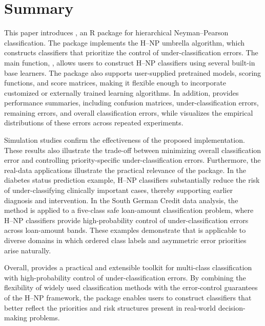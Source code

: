 \section{Summary}

This paper introduces \href{https://cran.r-project.org/web/packages/HNPclassifier/index.html}{}, an R package for hierarchical Neyman--Pearson classification. The package implements the H--NP umbrella algorithm, which constructs classifiers that prioritize the control of under-classification errors. The main function, , allows users to construct H--NP classifiers using several built-in base learners. The package also supports user-supplied pretrained models, scoring functions, and score matrices, making it flexible enough to incorporate customized or externally trained learning algorithms. In addition,  provides performance summaries, including confusion matrices, under-classification errors, remaining errors, and overall classification errors, while  visualizes the empirical distributions of these errors across repeated experiments.


Simulation studies confirm the effectiveness of the proposed implementation. These results also illustrate the trade-off between minimizing overall classification error and controlling priority-specific under-classification errors. Furthermore, the real-data applications illustrate the practical relevance of the package. In the diabetes status prediction example, H--NP classifiers substantially reduce the risk of under-classifying clinically important cases, thereby supporting earlier diagnosis and intervention. In the South German Credit data analysis, the method is applied to a five-class safe loan-amount classification problem, where H--NP classifiers provide high-probability control of under-classification errors across loan-amount bands. These examples demonstrate that \href{https://cran.r-project.org/web/packages/HNPclassifier/index.html}{} is applicable to diverse domains in which ordered class labels and asymmetric error priorities arise naturally.

Overall, \href{https://cran.r-project.org/web/packages/HNPclassifier/index.html}{} provides a practical and extensible toolkit for multi-class classification with high-probability control of under-classification errors. By combining the flexibility of widely used classification methods with the error-control guarantees of the H--NP framework, the package enables users to construct classifiers that better reflect the priorities and risk structures present in real-world decision-making problems.




